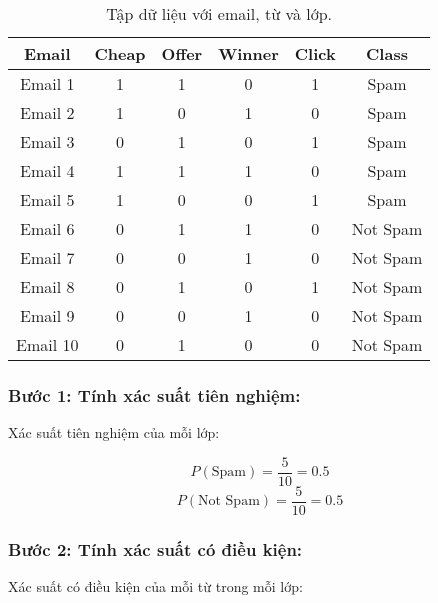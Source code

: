 \begin{table}[H]
\centering
\begin{tabular}{|c|c|c|c|c|c|}
\hline
\textbf{Email} & \textbf{Cheap} & \textbf{Offer} & \textbf{Winner} & \textbf{Click} & \textbf{Class} \\
\hline
Email 1 & 1 & 1 & 0 & 1 & Spam \\
Email 2 & 1 & 0 & 1 & 0 & Spam \\
Email 3 & 0 & 1 & 0 & 1 & Spam \\
Email 4 & 1 & 1 & 1 & 0 & Spam \\
Email 5 & 1 & 0 & 0 & 1 & Spam \\
Email 6 & 0 & 1 & 1 & 0 & Not Spam \\
Email 7 & 0 & 0 & 1 & 0 & Not Spam \\
Email 8 & 0 & 1 & 0 & 1 & Not Spam \\
Email 9 & 0 & 0 & 1 & 0 & Not Spam \\
Email 10 & 0 & 1 & 0 & 0 & Not Spam \\
\hline
\end{tabular}
\caption{Tập dữ liệu với email, từ và lớp.}
\end{table}

\subsubsection{Bước 1: Tính xác suất tiên nghiệm:}

Xác suất tiên nghiệm của mỗi lớp:

\[
P(\text{Spam}) = \frac{5}{10} = 0.5
\]
\[
P(\text{Not Spam}) = \frac{5}{10} = 0.5
\]

\subsubsection{Bước 2: Tính xác suất có điều kiện:}

Xác suất có điều kiện của mỗi từ trong mỗi lớp:

